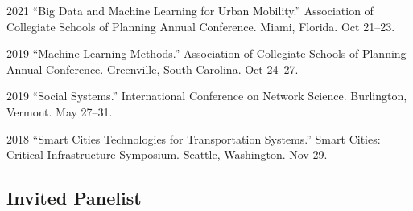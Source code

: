 \documentclass[11pt,letterpaper]{report}
\begin{document}
    \begin{tablist}

        \item[2021] \tab{}\enquote{Big Data and Machine Learning for Urban Mobility.} Association of Collegiate Schools of Planning Annual Conference. Miami, Florida. Oct 21--23.

        \item[2019] \tab{}\enquote{Machine Learning Methods.} Association of Collegiate Schools of Planning Annual Conference. Greenville, South Carolina. Oct 24--27.

        \item[2019] \tab{}\enquote{Social Systems.} International Conference on Network Science. Burlington, Vermont. May 27--31.

        \item[2018] \tab{}\enquote{Smart Cities Technologies for Transportation Systems.} Smart Cities: Critical Infrastructure Symposium. Seattle, Washington. Nov 29.

    \end{tablist}

    \subsection*{Invited Panelist}
\end{document}
